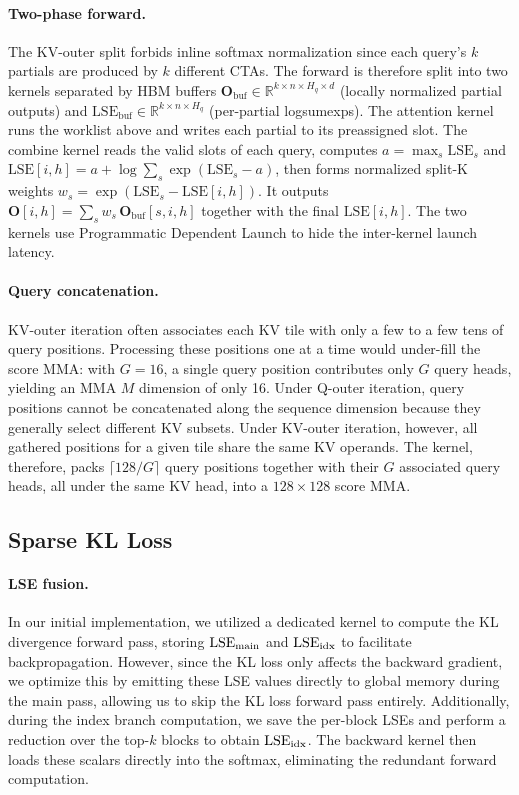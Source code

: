 \documentclass{llmxive}
\begin{document}
\paragraph{Two-phase forward.}
The KV-outer split forbids inline softmax normalization since each query's $k$ partials are produced by $k$ different CTAs. The forward is therefore split into two kernels separated by HBM buffers $\mathbf{O}_\text{buf} \in \mathbb{R}^{k \times n \times H_q \times d}$ (locally normalized partial outputs) and $\mathrm{LSE}_\text{buf} \in \mathbb{R}^{k \times n \times H_q}$ (per-partial logsumexps). The attention kernel runs the worklist above and writes each partial to its preassigned slot. The combine kernel reads the valid slots of each query, computes $a = \max_s \mathrm{LSE}_s$ and $\mathrm{LSE}[i, h] = a + \log \sum_s \exp(\mathrm{LSE}_s - a)$, then forms normalized split-K weights $w_s = \exp(\mathrm{LSE}_s - \mathrm{LSE}[i, h])$. It outputs $\mathbf{O}[i, h] = \sum_s w_s\, \mathbf{O}_\text{buf}[s, i, h]$ together with the final $\mathrm{LSE}[i, h]$. The two kernels use Programmatic Dependent Launch to hide the inter-kernel launch
latency.


\paragraph{Query concatenation.}
KV-outer iteration often associates each KV tile with only a few to a few tens of query positions. Processing these positions one at a time would under-fill the score MMA: with $G = 16$, a single query position contributes only $G$ query heads, yielding an MMA $M$ dimension of only 16. Under Q-outer iteration, query positions cannot be concatenated along the sequence dimension because they generally select different KV subsets. Under KV-outer iteration, however, all gathered positions for a given tile share the same KV operands. The kernel, therefore, packs $\lceil 128/G \rceil$ query positions together with their $G$ associated query heads, all under the same KV head, into a $128 \times 128$ score MMA.

\subsection{Sparse KL Loss}
\label{sec:kernel:sparse_kl}

\paragraph{LSE fusion.}
In our initial implementation, we utilized a dedicated kernel to compute the KL divergence forward pass, storing $\mathrm{LSE}_{\rm main}$ and $\mathrm{LSE}_{\rm idx}$ to facilitate backpropagation. However, since the KL loss only affects the backward gradient, we optimize this by emitting these LSE values directly to global memory during the main pass, allowing us to skip the KL loss forward pass entirely. Additionally, during the index branch computation, we save the per-block LSEs and perform a reduction over the top-$k$ blocks to obtain $\mathrm{LSE}_{\rm idx}$. The backward kernel then loads these scalars directly into the softmax, eliminating the redundant forward computation.
\end{document}
